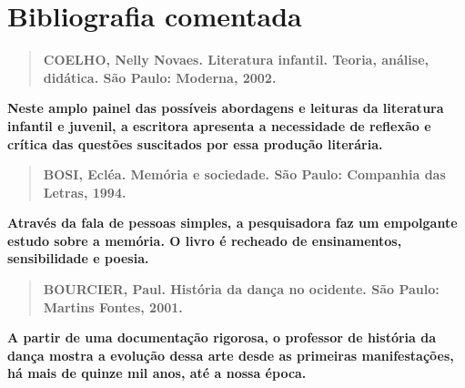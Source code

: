 \documentclass[12pt]{extarticle}
\begin{document}
\section{Bibliografia comentada}

\begin{quote} \textbf{COELHO, Nelly Novaes. Literatura infantil. Teoria,
análise, didática. São Paulo: Moderna, 2002.} \end{quote}

\textbf{Neste amplo painel das possíveis abordagens e leituras da literatura
infantil e juvenil, a escritora apresenta a necessidade de reflexão e crítica
das questões suscitados por essa produção literária.}

\begin{quote} \textbf{BOSI, Ecléa. Memória e sociedade. São Paulo: Companhia
das Letras, 1994.} \end{quote}

\textbf{Através da fala de pessoas simples, a pesquisadora faz um empolgante
estudo sobre a memória. O livro é recheado de ensinamentos, sensibilidade e
poesia.}

\begin{quote} \textbf{BOURCIER, Paul. História da dança no ocidente. São Paulo:
Martins Fontes, 2001.} \end{quote}

\textbf{A partir de uma documentação rigorosa, o professor de história da dança
mostra a evolução dessa arte desde as primeiras manifestações, há mais de
quinze mil anos, até a nossa época.}
\end{document}
